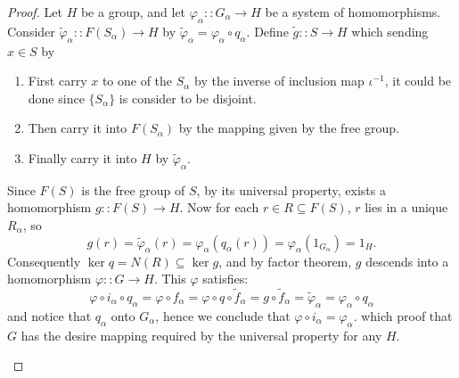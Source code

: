 \documentclass[a4paper,titlepage]{article}
\theoremstyle{remark}
\theoremstyle{definition}
\theoremstyle{definition}
\theoremstyle{plain}
\begin{document}
\begin{proof}
    Let $H$ be a group, and let $\varphi_\alpha :: G_\alpha \to H$ be a system of homomorphisms.
    Consider $\tilde{\varphi}_\alpha :: F(S_\alpha) \to H$ by $\tilde{\varphi}_\alpha = \varphi_\alpha \circ q_\alpha$.
    Define $\tilde{g} :: S \to H$ which sending $x \in S$ by
    \begin{enumerate}
      \item First carry $x$ to one of the $S_\alpha$ by the inverse of inclusion map $\iota^{-1}$, 
        it could be done since $\{S_\alpha\}$ is consider to be disjoint.
      \item Then carry it into $F(S_\alpha)$ by the mapping given by the free group.
      \item Finally carry it into $H$ by $\tilde{\varphi}_\alpha$.
    \end{enumerate}
    Since $F(S)$ is the free group of $S$, by its universal property, exists a homomorphism $g :: F(S) \to H$.
    Now for each $r \in R \subseteq F(S)$, $r$ lies in a unique $R_\alpha$, so
    \[ g(r) = \tilde{\varphi}_\alpha(r) = \varphi_\alpha(q_\alpha(r)) = \varphi_\alpha(1_{G_\alpha}) = 1_H. \]
    Consequently $\ker q = N(R) \subseteq \ker g$, and by factor theorem, $g$ descends into a
    homomorphism $\varphi :: G \to H$. This $\varphi$ satisfies:
    \[
      \varphi \circ i_\alpha \circ q_\alpha = \varphi \circ f_\alpha
      = \varphi \circ q \circ \tilde{f}_\alpha
      = g \circ \tilde{f}_\alpha
      = \tilde{\varphi}_\alpha
      = \varphi_\alpha \circ q_\alpha
    \]
    and notice that $q_\alpha$ onto $G_\alpha$, hence we conclude that $\varphi \circ i_\alpha = \varphi_\alpha$.
    which proof that $G$ has the desire mapping required by the universal property for any $H$.
    \begin{figure}[h]
      \centering
\end{figure}
\end{proof}
\end{document}
